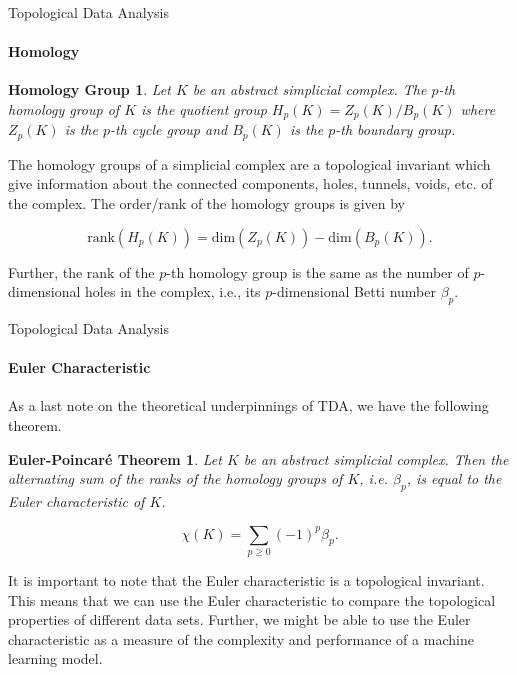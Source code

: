 \documentclass[pdf]{beamer}
\begin{document}
    \begin{frame}{Topological Data Analysis}
        \framesubtitle{Homology}
        \newtheorem{defn:homology}{Homology Group}

        \begin{defn:homology}
            Let $K$ be an abstract simplicial complex. The {\color{red} $p$-th homology group} of $K$ is the quotient 
            group $H_p(K) = Z_p(K) / B_p(K)$ where $Z_p(K)$ is the $p$-th cycle group and $B_p(K)$ is the $p$-th 
            boundary group.
        \end{defn:homology}

        The homology groups of a simplicial complex are a topological invariant which give information about the 
        connected components, holes, tunnels, voids, etc. of the complex. The order/rank of the homology groups
        is given by 

        \begin{equation*}
            \text{rank}(H_p(K)) = \text{dim}(Z_p(K)) - \text{dim}(B_p(K)).
        \end{equation*}

        Further, the rank of the $p$-th homology group is the same as the number of $p$-dimensional holes in the complex, i.e., its $p$-dimensional {\color{red} Betti number} $\beta_p$.
    \end{frame}

    \begin{frame}{Topological Data Analysis}
        \framesubtitle{Euler Characteristic}
        \newtheorem{thrm:ept}{Euler-Poincar\'{e} Theorem}

        As a last note on the theoretical underpinnings of TDA, we have the following theorem.

        \begin{thrm:ept}
            Let $K$ be an abstract simplicial complex. Then the alternating sum of the ranks of the homology groups
            of $K$, i.e. $\beta_p$, is equal to the Euler characteristic of $K$.

            \begin{equation*}
                \chi(K) = \sum_{p\geq 0} (-1)^p \beta_p.
            \end{equation*}
        \end{thrm:ept}

        It is important to note that the Euler characteristic is a topological invariant. This means that we can use 
        the Euler characteristic to compare the topological properties of different data sets. Further, we might be 
        able to use the Euler characteristic as a measure of the complexity and performance of a machine learning model.
    \end{frame}
\end{document}

